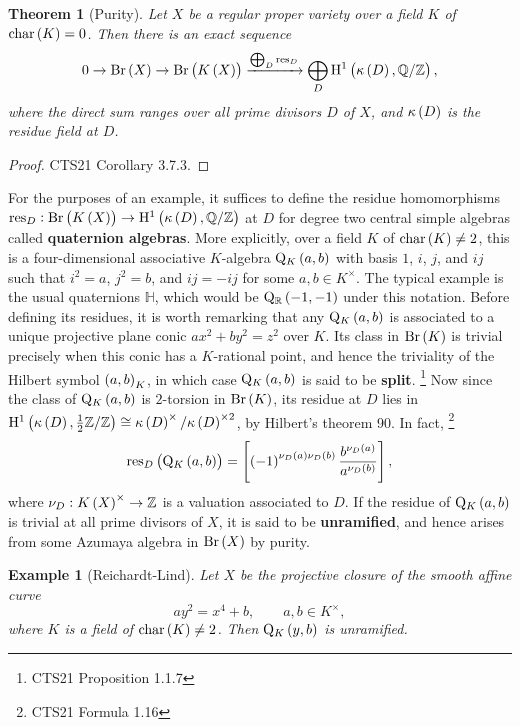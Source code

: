 \documentclass{article}
\newtheorem*{example}{Example}
\newtheorem*{theorem}{Theorem}
\newcommand{\br}{\del}
\newcommand{\Br}{\mathrm{Br}}
\newcommand{\ch}{\mathrm{char}}
\renewcommand{\H}{\mathrm{H}}
\newcommand{\HH}{\mathbb{H}}
\newcommand{\Q}{\mathrm{Q}}
\newcommand{\QQ}{\mathbb{Q}}
\newcommand{\RR}{\mathbb{R}}
\newcommand{\res}{\mathrm{res}}
\newcommand{\ZZ}{\mathbb{Z}}
\begin{document}
\begin{theorem}[Purity]
Let $ X $ be a regular proper variety over a field $ K $ of $ \ch\br{K} = 0 $. Then there is an exact sequence
$$ 0 \to \Br\br{X} \to \Br\br{K\br{X}} \xrightarrow{\bigoplus_D \res_D} \bigoplus_D \H^1\br{\kappa\br{D}, \QQ / \ZZ}, $$
where the direct sum ranges over all prime divisors $ D $ of $ X $, and $ \kappa\br{D} $ is the residue field at $ D $.
\end{theorem}

\begin{proof}
CTS21 Corollary 3.7.3.
\end{proof}

For the purposes of an example, it suffices to define the residue homomorphisms $ \res_D : \Br\br{K\br{X}} \to \H^1\br{\kappa\br{D}, \QQ / \ZZ} $ at $ D $ for degree two central simple algebras called \textbf{quaternion algebras}. More explicitly, over a field $ K $ of $ \ch\br{K} \ne 2 $, this is a four-dimensional associative $ K $-algebra $ \Q_K\br{a, b} $ with basis $ 1 $, $ i $, $ j $, and $ ij $ such that $ i^2 = a $, $ j^2 = b $, and $ ij = -ij $ for some $ a, b \in K^\times $. The typical example is the usual quaternions $ \HH $, which would be $ \Q_\RR\br{-1, -1} $ under this notation. Before defining its residues, it is worth remarking that any $ \Q_K\br{a, b} $ is associated to a unique projective plane conic $ ax^2 + by^2 = z^2 $ over $ K $. Its class in $ \Br\br{K} $ is trivial precisely when this conic has a $ K $-rational point, and hence the triviality of the Hilbert symbol $ \br{a, b}_K $, in which case $ \Q_K\br{a, b} $ is said to be \textbf{split}. \footnote{CTS21 Proposition 1.1.7} Now since the class of $ \Q_K\br{a, b} $ is $ 2 $-torsion in $ \Br\br{K} $, its residue at $ D $ lies in $ \H^1\br{\kappa\br{D}, \tfrac{1}{2}\ZZ / \ZZ} \cong \kappa\br{D}^\times / \kappa\br{D}^{\times2} $, by Hilbert's theorem 90. In fact, \footnote{CTS21 Formula 1.16}
$$ \res_D\br{\Q_K\br{a, b}} = \sbr{\br{-1}^{\nu_D\br{a}\nu_D\br{b}}\dfrac{b^{\nu_D\br{a}}}{a^{\nu_D\br{b}}}}, $$
where $ \nu_D : K\br{X}^\times \to \ZZ $ is a valuation associated to $ D $. If the residue of $ \Q_K\br{a, b} $ is trivial at all prime divisors of $ X $, it is said to be \textbf{unramified}, and hence arises from some Azumaya algebra in $ \Br\br{X} $ by purity.

\begin{example}[Reichardt-Lind]
Let $ X $ be the projective closure of the smooth affine curve
$$ ay^2 = x^4 + b, \qquad a, b \in K^\times, $$
where $ K $ is a field of $ \ch\br{K} \ne 2 $. Then $ \Q_K\br{y, b} $ is unramified.
\end{example}
\end{document}
